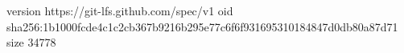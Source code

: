 version https://git-lfs.github.com/spec/v1
oid sha256:1b1000fcde4c1c2cb367b9216b295e77c6f6f931695310184847d0db80a87d71
size 34778

